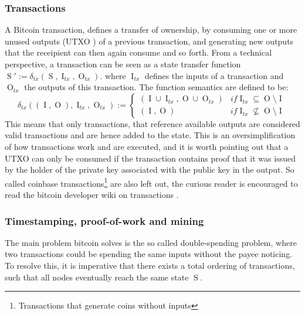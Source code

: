 \documentclass[12pt,msc,a4paper,oneside]{ucl_thesis}
\DeclareMathOperator{\Btcstate}{S}
\DeclareMathOperator{\Btcinput}{I}
\DeclareMathOperator{\Btcoutput}{O}
\begin{document}
\subsubsection{Transactions}
A Bitcoin transaction, defines a transfer of ownership, by consuming one or more unused outputs (UTXO \cite{bitcoin_wiki:utxo}) of a previous transaction, and generating new outputs that the receipient can then again consume and so forth. From a technical perspective, a transaction can be seen as a state transfer function $\Btcstate' := \delta_{tx}(\Btcstate, \Btcinput_{tx}, \Btcoutput_{tx})$. where $\Btcinput_{tx}$ defines the inputs of a transaction and $\Btcoutput_{tx}$ the outputs of this transaction. The function semantics are defined to be:
\begin{equation}
    \delta_{tx}((\Btcinput, \Btcoutput), \Btcinput_{tx}, \Btcoutput_{tx}) := \begin{cases}
        (\Btcinput \cup \Btcinput_{tx}, \Btcoutput \cup \Btcoutput_{tx}) & if \Btcinput_{tx} \subseteq \Btcoutput \setminus \Btcinput \\
        (\Btcinput, \Btcoutput) & if \Btcinput_{tx} \not\subseteq \Btcoutput \setminus \Btcinput
    \end{cases}
\end{equation}
This means that only transactions, that reference available outputs are considered valid transactions and are hence added to the state. This is an oversimplification of how transactions work and are executed, and it is worth pointing out that a UTXO can only be consumed if the transaction contains proof that it was issued by the holder of the private key associated with the public key in the output. So called coinbase transactions\footnote{Transactions that generate coins without inputs} are also left out, the curious reader is encouraged to read the bitcoin developer wiki on transactions \cite{bitcoin_wiki:transactions}.

\subsubsection{Timestamping, proof-of-work and mining}
The main problem bitcoin solves is the so called double-spending problem, where two transactions could be spending the same inputs without the payee noticing. To resolve this, it is imperative that there exists a total ordering of transactions, such that all nodes eventually reach the same state $\Btcstate$.
\end{document}
